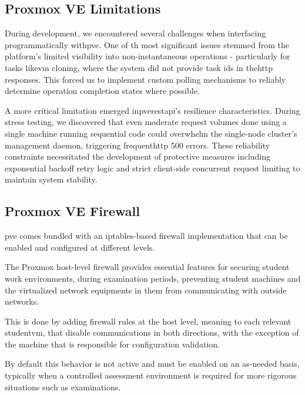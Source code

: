     \subsection{Proxmox VE Limitations}

        During development, we encountered several challenges when interfacing programmatically with\ac{pve}. One of th most significant 
        issues stemmed from the platform's limited visibility into non-instantaneous operations - particularly for tasks like\ac{vm} cloning, 
        where the system did not provide task ids in the\ac{http} responses. This forced us to implement custom polling mechanisms to reliably 
        determine operation completion states where possible.

        A more critical limitation emerged in\ac{pve}\ac{rest}\ac{api}'s resilience characteristics. During stress testing, we discovered that 
        even moderate request volumes done using a single machine running sequential code could overwhelm the single-node cluster's management 
        daemon, triggering frequent\ac{http} 500 errors. These reliability constraints necessitated the development of protective measures 
        including exponential backoff retry logic and strict client-side concurrent request limiting to maintain system stability.

    \subsection{Proxmox VE Firewall}

        \ac{pve} comes bundled with an iptables-based firewall implementation that can be enabled and configured at different levels.

        The Proxmox host-level firewall provides essential features for securing student work environments, during examination 
        periods, preventing student machines and the virtualized network equipments in them from communicating with outside networks.

        This is done by adding firewall rules at the host level, meaning to each relevant student\ac{vm}, that disable communications
        in both directions, with the exception of the machine that is responsible for configuration validation.

        By default this behavior is not active and must be enabled on an as-needed basis, typically when a controlled assessment 
        environment is required for more rigorous situations such as examinations.

